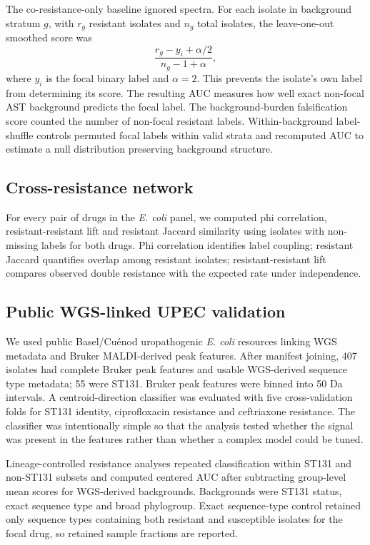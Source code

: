 \documentclass[11pt]{article}
\begin{document}
The co-resistance-only baseline ignored spectra. For each isolate in background stratum $g$, with $r_g$ resistant isolates and $n_g$ total isolates, the leave-one-out smoothed score was
\[
  \frac{r_g-y_i+\alpha/2}{n_g-1+\alpha},
\]
where $y_i$ is the focal binary label and $\alpha=2$. This prevents the isolate's own label from determining its score. The resulting AUC measures how well exact non-focal AST background predicts the focal label. The background-burden falsification score counted the number of non-focal resistant labels. Within-background label-shuffle controls permuted focal labels within valid strata and recomputed AUC to estimate a null distribution preserving background structure.

\subsection*{Cross-resistance network}

For every pair of drugs in the \textit{E. coli} panel, we computed phi correlation, resistant-resistant lift and resistant Jaccard similarity using isolates with non-missing labels for both drugs. Phi correlation identifies label coupling; resistant Jaccard quantifies overlap among resistant isolates; resistant-resistant lift compares observed double resistance with the expected rate under independence.

\subsection*{Public WGS-linked UPEC validation}

We used public Basel/Cu\'{e}nod uropathogenic \textit{E. coli} resources linking WGS metadata and Bruker MALDI-derived peak features\cite{cuenod2023papgii}. After manifest joining, 407 isolates had complete Bruker peak features and usable WGS-derived sequence type metadata; 55 were ST131. Bruker peak features were binned into 50 Da intervals. A centroid-direction classifier was evaluated with five cross-validation folds for ST131 identity, ciprofloxacin resistance and ceftriaxone resistance. The classifier was intentionally simple so that the analysis tested whether the signal was present in the features rather than whether a complex model could be tuned.

Lineage-controlled resistance analyses repeated classification within ST131 and non-ST131 subsets and computed centered AUC after subtracting group-level mean scores for WGS-derived backgrounds. Backgrounds were ST131 status, exact sequence type and broad phylogroup. Exact sequence-type control retained only sequence types containing both resistant and susceptible isolates for the focal drug, so retained sample fractions are reported.
\end{document}
